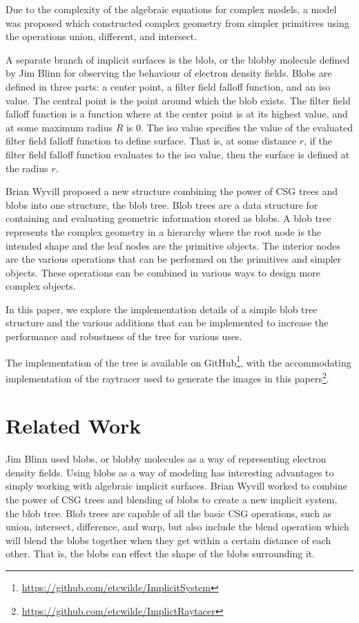 \documentclass[conference]{acmsiggraph}
\begin{document}
Due to the complexity of the algebraic equations for complex models, a model
was proposed which constructed complex geometry from simpler primitives using
the operations union, different, and intersect.

A separate branch of implicit surfaces is the blob, or the blobby molecule
defined by Jim Blinn\cite{Blinn} for observing the behaviour of electron
density fields. Blobs are defined in three parts: a center point, a filter
field falloff function, and an iso value. The central point is the point around
which the blob exists. The filter field falloff function is a function where at
the center point is at its highest value, and at some maximum radius $R$ is 0.
The iso value specifies the value of the evaluated filter field falloff
function to define surface. That is, at some distance $r$, if the filter field
falloff function evaluates to the iso value, then the surface is defined at the
radius $r$.

Brian Wyvill proposed a new structure combining the power of CSG trees and
blobs into one structure, the blob tree. Blob trees are a data structure for
containing and evaluating geometric information stored as blobs. A blob tree
represents the complex geometry in a hierarchy where the root node is the
intended shape and the leaf nodes are the primitive objects. The interior nodes
are the various operations that can be performed on the primitives and simpler
objects. These operations can be combined in various ways to design more
complex objects.

In this paper, we explore the implementation details of a simple blob tree
structure and the various additions that can be implemented to increase the
performance and robustness of the tree for various uses.

The implementation of the tree is available on
GitHub\footnote{\url{https://github.com/etcwilde/ImplicitSystem}}, with the
accommodating implementation of the raytracer used to generate the images in
this papers\footnote{\url{https://github.com/etcwilde/ImplictRaytacer}}.


\section{Related Work}
Jim Blinn used blobs, or blobby molecules as a way of representing electron
density fields\cite{Blinn}. Using blobs as a way of modeling has interesting
advantages to simply working with algebraic implicit surfaces. Brian Wyvill
worked to combine the power of CSG trees and blending of blobs to create a new
implicit system, the blob tree. Blob trees are capable of all the basic CSG
operations, such as union, intersect, difference, and warp, but also include
the blend operation which will blend the blobs together when they get within a
certain distance of each other. That is, the blobs can effect the shape of the
blobs surrounding it.
\end{document}
